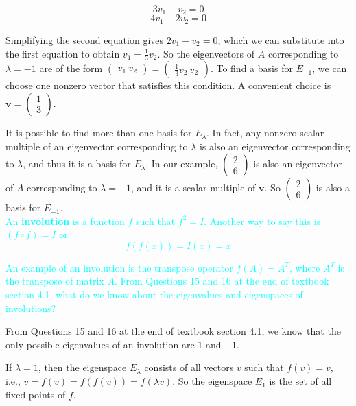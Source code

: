 \documentclass[fontsize=12pt]{scrartcl}
\begin{document}
$$3v_1 - v_2 = 0 $$
$$4v_1 - 2v_2 = 0 $$

\noindent
Simplifying the second equation gives $2v_1 - v_2 = 0$, which we can substitute into the first equation to obtain $v_1 = \frac{1}{3}v_2$. So the eigenvectors of $A$ corresponding to $\lambda=-1$ are of the form $\begin{pmatrix} v_1 \ v_2 \end{pmatrix} = \begin{pmatrix} \frac{1}{3}v_2 \ v_2 \end{pmatrix}$. To find a basis for $E_{-1}$, we can choose one nonzero vector that satisfies this condition. A convenient choice is $\mathbf{v} = \begin{pmatrix} 1 \\ 3 \end{pmatrix}$. 

\noindent
It is possible to find more than one basis for $E_{\lambda}$. In fact, any nonzero scalar multiple of an eigenvector corresponding to $\lambda$ is also an eigenvector corresponding to $\lambda$, and thus it is a basis for $E_{\lambda}$. In our example, $\begin{pmatrix} 2 \\ 6 \end{pmatrix}$ is also an eigenvector of $A$ corresponding to $\lambda=-1$, and it is a scalar multiple of $\mathbf{v}$. So $\begin{pmatrix} 2 \\ 6 \end{pmatrix}$ is also a basis for $E_{-1}$.
\\

\noindent
\textcolor{cyan}{An \textbf{involution} is a function $f$ such that $f^2 = I$. Another way to say this is $(f \circ f) = I$ or  $$f(f(x)) = I(x) = x$$}

\noindent
\textcolor{cyan}{An example of an involution is the transpose operator $f(A) = A^T$, where $A^T$ is the transpose of matrix $A$. From Questions 15 and 16 at the end of textbook section 4.1, what do we know about the eigenvalues and eigenspaces of involutions?}

\noindent
From Questions 15 and 16 at the end of textbook section 4.1, we know that the only possible eigenvalues of an involution are $1$ and $-1$.

\noindent
If $\lambda = 1$, then the eigenspace $E_{\lambda}$ consists of all vectors $v$ such that $f(v) = v$, i.e., $v = f(v) = f(f(v)) = f(\lambda v)$. So the eigenspace $E_{1}$ is the set of all fixed points of $f$.
\end{document}
